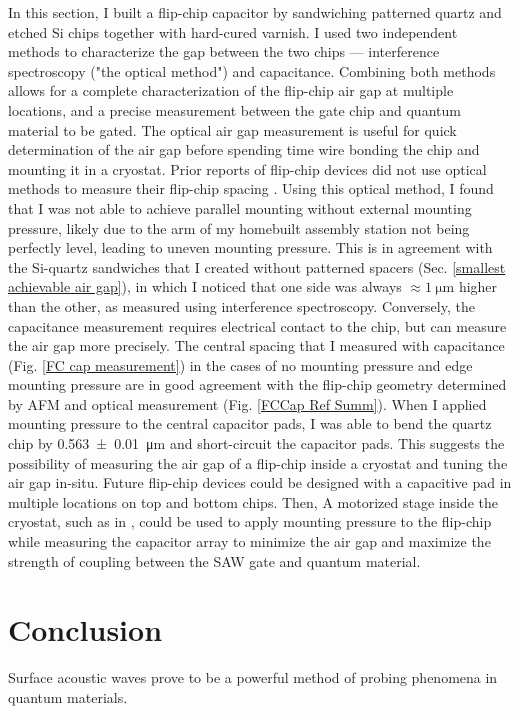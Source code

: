 \documentclass[double,12pt,1in]{beavtex}
\begin{document}
In this section, I built a flip-chip capacitor by sandwiching patterned quartz and etched Si chips together with hard-cured varnish. I used two independent methods to characterize the gap between the two chips — interference spectroscopy ("the optical method") and capacitance. Combining both methods allows for a complete characterization of the flip-chip air gap at multiple locations, and a precise measurement between the gate chip and quantum material to be gated. The optical air gap measurement is useful for quick determination of the air gap before spending time wire bonding the chip and mounting it in a cryostat. Prior reports of flip-chip devices did not use optical methods to measure their flip-chip spacing \cite{beukman_noninvasive_2015, chu_creation_2018,satzinger_quantum_2018,bennaceur_mechanical_2015}. Using this optical method, I found that I was not able to achieve parallel mounting without external mounting pressure, likely due to the arm of my homebuilt assembly station not being perfectly level, leading to uneven mounting pressure. This is in agreement with the Si-quartz sandwiches that I created without patterned spacers (Sec. \ref{smallest achievable air gap}), in which I noticed that one side was always $\approx \SI{1}{\micro\meter}$ higher than the other, as measured using interference spectroscopy. Conversely, the capacitance measurement requires electrical contact to the chip, but can measure the air gap more precisely. The central spacing that I measured with capacitance (Fig. \ref{FC cap measurement}) in the cases of no mounting pressure and edge mounting pressure are in good agreement with the flip-chip geometry determined by AFM and optical measurement (Fig. \ref{FCCap Ref Summ}). When I applied mounting pressure to the central capacitor pads, I was able to bend the quartz chip by \SI{0.563(10)}{\micro\meter} and short-circuit the capacitor pads. This suggests the possibility of measuring the air gap of a flip-chip inside a cryostat and tuning the air gap in-situ. Future flip-chip devices could be designed with a capacitive pad in multiple locations on top and bottom chips. Then, A motorized stage inside the cryostat, such as in \cite{inbar_quantum_2023}, could be used to apply mounting pressure to the flip-chip while measuring the capacitor array to minimize the air gap and maximize the strength of coupling between the SAW gate and quantum material. 


\chapter{Conclusion}
Surface acoustic waves prove to be a powerful method of probing phenomena in quantum materials. 
\end{document}
